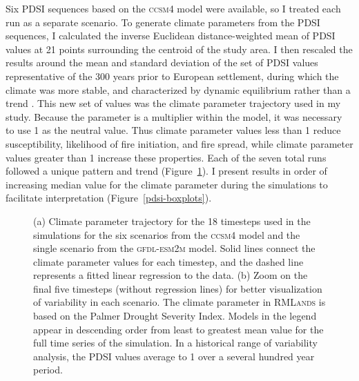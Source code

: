 Six PDSI sequences based on the \textsc{ccsm4} model were available, so I treated each run as a separate scenario. To generate climate parameters from the PDSI sequences, I calculated the inverse Euclidean distance-weighted mean of PDSI values at 21 points surrounding the centroid of the study area. I then rescaled the results around the mean and standard deviation of the set of PDSI values representative of the 300 years prior to European settlement, during which the climate was more stable, and characterized by dynamic equilibrium rather than a trend \citep{Diamond1969,Cook2004}. This new set of values was the climate parameter trajectory used in my study. Because the parameter is a multiplier within the model, it was necessary to use 1 as the neutral value. Thus climate parameter values less than 1 reduce susceptibility, likelihood of fire initiation, and fire spread, while climate parameter values greater than 1 increase these properties. Each of the seven total runs followed a unique pattern and trend (Figure~\ref{fig:pdsi_future}). I present results in order of increasing median value for the climate parameter during the simulations to facilitate interpretation (Figure~\ref{pdsi-boxplots}). %


\begin{figure}[!htbp]
\centering
    \caption{(a) Climate parameter trajectory for the 18 timesteps used in the simulations for the six scenarios from the \textsc{ccsm4} model and the single scenario from the \textsc{gfdl-esm2m} model. Solid lines connect the climate parameter values for each timestep, and the dashed line represents a fitted linear regression to the data. (b) Zoom on the final five timesteps (without regression lines) for better visualization of variability in each scenario. The climate parameter in \textsc{RMLands} is based on the Palmer Drought Severity Index. Models in the legend appear in descending order from least to greatest mean value for the full time series of the simulation. In a historical range of variability analysis, the PDSI values average to 1 over a several hundred year period.}
\label{fig:pdsi_future}

\end{figure}

